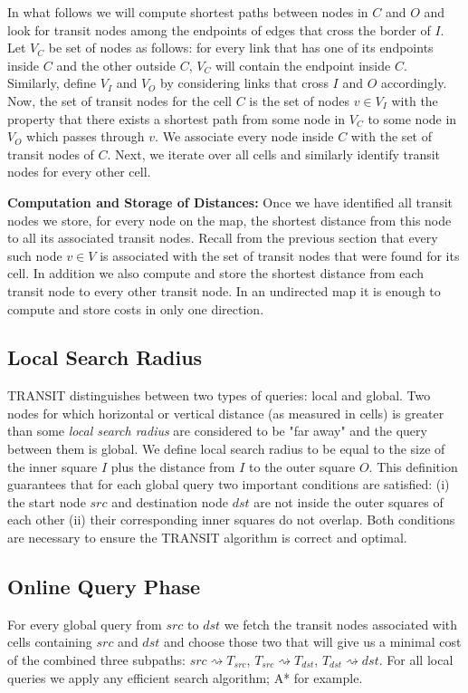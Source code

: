 In what follows we will compute shortest paths between nodes in $C$ and $O$ and look for
transit nodes among the endpoints of edges that cross the border of $I$.
Let $V_C$ be set of nodes as follows: for every link that has one of its endpoints inside $C$ and the other outside $C$,
$V_C$ will contain the endpoint inside $C$. Similarly, define $V_{I}$ and $V_{O}$ by considering links that cross $I$ and $O$ accordingly.
Now, the set of transit nodes for the cell $C$ is the set of nodes $v \in V_{I}$ with the property that there exists a shortest path from
some node in $V_C$ to some node in $V_{O}$ which passes through $v$. We associate every node inside $C$ with the
set of transit nodes of $C$. Next, we iterate over all cells and similarly identify transit nodes for every other cell.

\textbf{Computation and Storage of Distances: } Once we have identified all transit nodes we store, for every node on the map, the shortest distance
from this node to all its associated transit nodes.  Recall from the previous section that every
such node $v \in V$ is associated with the set of transit nodes that were found for its cell.  In
addition we also compute and store the shortest distance from each transit node to every other
transit node.  In an undirected map it is enough to compute and store costs in only one direction.

\subsection {Local Search Radius}
\label{sub:local_radius}
TRANSIT distinguishes between two types of queries: local and global.  Two nodes for which
horizontal or vertical distance (as measured in cells) is greater than some \emph{local search
radius} are considered to be "far away" and the query between them is global.  We define
local search radius to be equal to the size of the inner square $I$ plus the distance from $I$ to the
outer square $O$.
This definition guarantees that for each global query two important conditions are satisfied:
 (i) the start node $src$ and destination node $dst$ are not inside the outer squares of each other
(ii) their corresponding inner squares do not overlap. 
Both conditions are necessary to ensure the TRANSIT algorithm is correct and optimal.

\subsection{Online Query Phase}
For every global query from $src$ to $dst$ we fetch the transit nodes associated with cells containing 
$src$ and $dst$ and choose those two that will give us a minimal cost of the combined three subpaths:
$src \rightsquigarrow T_{src}$, $T_{src} \rightsquigarrow T_{dst}$, $T_{dst} \rightsquigarrow dst$.
For all local queries we apply any efficient search algorithm; A* for example.

